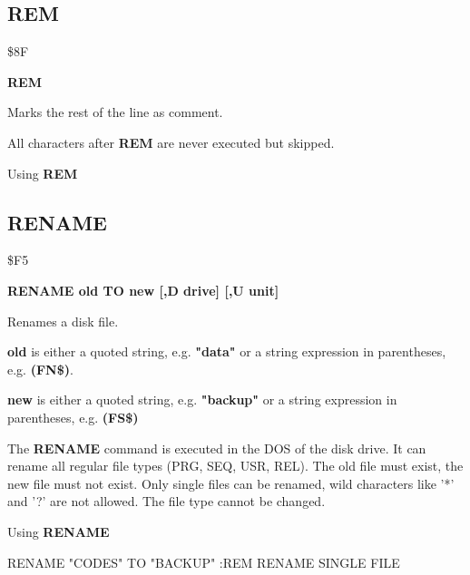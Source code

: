 
\newpage
\subsection{REM}
\begin{description}[leftmargin=3cm,style=nextline]
\item [Token:] \$8F
\item [Format:] {\bf REM}
\item [Usage:]  Marks the rest of the line as comment.

                All characters after {\bf REM} are never executed
                but skipped.

\item [Example:] Using {\bf REM}

\end{description}


\newpage
\subsection{RENAME}
\begin{description}[leftmargin=3cm,style=nextline]
\item [Token:] \$F5
\item [Format:] {\bf RENAME old TO new [,D drive] [,U unit] }
\item [Usage:] Renames a disk file.

   {\bf old} is either a quoted string, e.g. {\bf "data"} or
   a string expression in parentheses, e.g. {\bf (FN\$)}.

   {\bf new} is either a quoted string, e.g. {\bf "backup"} or
   a string expression in parentheses, e.g. {\bf (FS\$)}

   \drivedefinition

   \unitdefinition

\item [Remarks:]
   The {\bf RENAME} command is executed in the DOS of the disk drive.
   It can rename all regular file types (PRG, SEQ, USR, REL).
   The old file must exist, the new file must not exist.
   Only single files can be renamed, wild characters like
   '*' and '?' are not allowed. The file type cannot be changed.

\item [Example:] Using {\bf RENAME}
\begin{screenoutput}
  RENAME "CODES" TO "BACKUP" :REM RENAME SINGLE FILE
\end{screenoutput}
\end{description}

